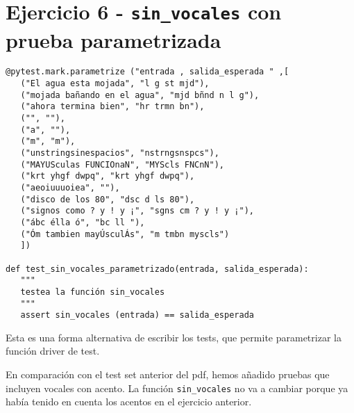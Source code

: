 \newpage
\section{Ejercicio 6 - \texttt{sin\_vocales} con prueba parametrizada}

\begin{lstlisting}
@pytest.mark.parametrize ("entrada , salida_esperada " ,[
   ("El agua esta mojada", "l g st mjd"),
   ("mojada bañando en el agua", "mjd bñnd n l g"),
   ("ahora termina bien", "hr trmn bn"),
   ("", ""),
   ("a", ""),
   ("m", "m"),
   ("unstringsinespacios", "nstrngsnspcs"),
   ("MAYUSculas FUNCIOnaN", "MYScls FNCnN"),
   ("krt yhgf dwpq", "krt yhgf dwpq"),
   ("aeoiuuuoiea", ""),
   ("disco de los 80", "dsc d ls 80"),
   ("signos como ? y ! y ¡", "sgns cm ? y ! y ¡"),
   ("ábc élla ó", "bc ll "),
   ("Óm tambien mayÚsculÁs", "m tmbn myscls")
   ])

def test_sin_vocales_parametrizado(entrada, salida_esperada):
   """
   testea la función sin_vocales
   """
   assert sin_vocales (entrada) == salida_esperada
\end{lstlisting}

Esta es una forma alternativa de escribir los tests, que permite parametrizar la función driver de test.

En comparación con el test set anterior del pdf, hemos añadido pruebas que incluyen vocales con acento. La función \lstinline|sin_vocales| no va a cambiar porque ya había tenido en cuenta los acentos en el ejercicio anterior.